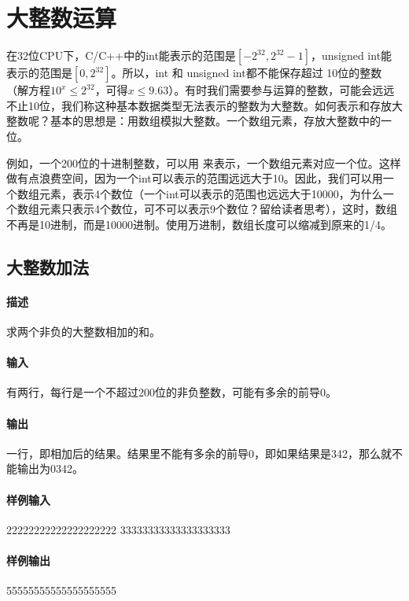 \chapter{大整数运算}
在32位CPU下，C/C++中的int能表示的范围是$[-2^{32}, 2^{32}-1]$，unsigned int能表示的范围是$[0, 2^{32}]$。所以，int 和 unsigned int都不能保存超过 10位的整数（解方程$10^x \leq 2^{32}$，可得$x \leq 9.63$）。有时我们需要参与运算的整数，可能会远远不止10位，我们称这种基本数据类型无法表示的整数为大整数。如何表示和存放大整数呢？基本的思想是：用数组模拟大整数。一个数组元素，存放大整数中的一位。

例如，一个200位的十进制整数，可以用 来表示，一个数组元素对应一个位。这样做有点浪费空间，因为一个int可以表示的范围远远大于10。因此，我们可以用一个数组元素，表示4个数位（一个int可以表示的范围也远远大于10000，为什么一个数组元素只表示4个数位，可不可以表示9个数位？留给读者思考），这时，数组不再是10进制，而是10000进制。使用万进制，数组长度可以缩减到原来的1/4。

\section{大整数加法} %
\subsubsection{描述}
求两个非负的大整数相加的和。

\subsubsection{输入}
有两行，每行是一个不超过200位的非负整数，可能有多余的前导0。

\subsubsection{输出}
一行，即相加后的结果。结果里不能有多余的前导0，即如果结果是342，那么就不能输出为0342。

\subsubsection{样例输入}
\begin{Code}
22222222222222222222 
33333333333333333333
\end{Code}

\subsubsection{样例输出}
\begin{Code}
55555555555555555555
\end{Code}

